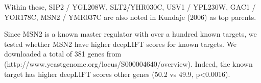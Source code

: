 \documentclass{article}
\begin{document}
Within these, SIP2 / YGL208W, SLT2/YHR030C, USV1 / YPL230W, GAC1 / YOR178C, MSN2 / YMR037C are also noted in Kundaje (2006) as top parents.

Since MSN2 is a known master regulator with over a hundred known targets, we tested whether MSN2 have higher deepLIFT scores for known targets. We downloaded a total of 381 genes from (http://www.yeastgenome.org/locus/S000004640/overview). Indeed, the known target has higher deepLIFT scores other genes (50.2 vs 49.9, p<0.0016). 
\end{document}
